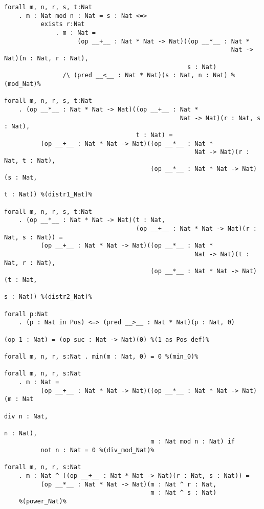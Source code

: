 \documentclass[11pt,a4paper]{article}
\begin{document}
\begin{verbatim}
forall m, n, r, s, t:Nat
    . m : Nat mod n : Nat = s : Nat <=>
          exists r:Nat
              . m : Nat =
                    (op __+__ : Nat * Nat -> Nat)((op __*__ : Nat *
                                                              Nat -> Nat)(n : Nat, r : Nat),
                                                  s : Nat)
                /\ (pred __<__ : Nat * Nat)(s : Nat, n : Nat) %(mod_Nat)%

forall m, n, r, s, t:Nat
    . (op __*__ : Nat * Nat -> Nat)((op __+__ : Nat *
                                                Nat -> Nat)(r : Nat, s : Nat),
                                    t : Nat) =
          (op __+__ : Nat * Nat -> Nat)((op __*__ : Nat *
                                                    Nat -> Nat)(r : Nat, t : Nat),
                                        (op __*__ : Nat * Nat -> Nat)(s : Nat,
                                                                      t : Nat)) %(distr1_Nat)%

forall m, n, r, s, t:Nat
    . (op __*__ : Nat * Nat -> Nat)(t : Nat,
                                    (op __+__ : Nat * Nat -> Nat)(r : Nat, s : Nat)) =
          (op __+__ : Nat * Nat -> Nat)((op __*__ : Nat *
                                                    Nat -> Nat)(t : Nat, r : Nat),
                                        (op __*__ : Nat * Nat -> Nat)(t : Nat,
                                                                      s : Nat)) %(distr2_Nat)%

forall p:Nat
    . (p : Nat in Pos) <=> (pred __>__ : Nat * Nat)(p : Nat, 0)

(op 1 : Nat) = (op suc : Nat -> Nat)(0) %(1_as_Pos_def)%

forall m, n, r, s:Nat . min(m : Nat, 0) = 0 %(min_0)%

forall m, n, r, s:Nat
    . m : Nat =
          (op __+__ : Nat * Nat -> Nat)((op __*__ : Nat * Nat -> Nat)(m : Nat
                                                                      div n : Nat,
                                                                      n : Nat),
                                        m : Nat mod n : Nat) if
          not n : Nat = 0 %(div_mod_Nat)%

forall m, n, r, s:Nat
    . m : Nat ^ ((op __+__ : Nat * Nat -> Nat)(r : Nat, s : Nat)) =
          (op __*__ : Nat * Nat -> Nat)(m : Nat ^ r : Nat,
                                        m : Nat ^ s : Nat)
    %(power_Nat)%
\end{verbatim}
\end{document}
